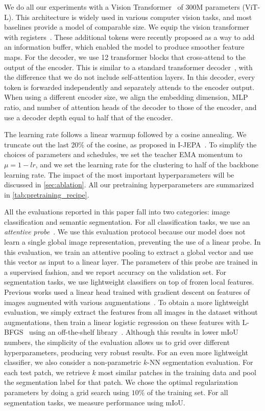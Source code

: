 We do all our experiments with a Vision Transformer~\citep{dosovitskiy2020image} of 300M parameters (ViT-L).
This architecture is widely used in various computer vision tasks, and most baselines provide a model of comparable size.
We equip the vision transformer with registers~\citep{vitneedreg}.
These additional tokens were recently proposed as a way to add an information buffer, which enabled the model to produce smoother feature maps.
For the decoder, we use 12 transformer blocks that cross-attend to the output of the encoder.
This is similar to a standard transformer decoder~\citep{vaswani2017attention}, with the difference that we do not include self-attention layers.
In this decoder, every token is forwarded independently and separately attends to the encoder output.
When using a different encoder size, we align the embedding dimension, MLP ratio, and number of attention heads of the decoder to those of the encoder, and use a decoder depth equal to half that of the encoder.

The learning rate follows a linear warmup followed by a cosine annealing.
We truncate out the last 20\% of the cosine, as proposed in I-JEPA~\citep{ijepa}.
To simplify the choices of parameters and schedules, we set the teacher EMA momentum to $\mu = 1-lr$, and we set the learning rate for the clustering to half of the backbone learning rate.
The impact of the most important hyperparameters will be discussed in \cref{sec:ablation}.
All our pretraining hyperparameters are summarized in \cref{tab:pretraining_recipe}.

All the evaluations reported in this paper fall into two categories: image classification and semantic segmentation.
For all classification tasks, we use an \emph{attentive probe}~\citep{ijepa,aim,bardes2023v}.
We use this evaluation protocol because our model does not learn a single global image representation, preventing the use of a linear probe.
In this evaluation, we train an attentive pooling to extract a global vector and use this vector as input to a linear layer.
The parameters of this probe are trained in a supervised fashion, and we report accuracy on the validation set.
For segmentation tasks, we use lightweight classifiers on top of frozen local features.
Previous works used a linear head trained with gradient descent on features of images augmented with various augmentations~\citep{dinov2}.
To obtain a more lightweight evaluation, we simply extract the features from all images in the dataset without augmentations, then train a linear logistic regression on these features with L-BFGS~\citep{lbfgs} using an off-the-shelf library~\citep{cuml}.
Although this results in lower mIoU numbers, the simplicity of the evaluation allows us to grid over different hyperparameters, producing very robust results.
For an even more lightweight classifier, we also consider a non-parametric $k$-NN segmentation evaluation.
For each test patch, we retrieve $k$ most similar patches in the training data and pool the segmentation label for that patch.
We chose the optimal regularization parameters by doing a grid search using $10\%$ of the training set.
For all segmentation tasks, we measure performance using mIoU.

